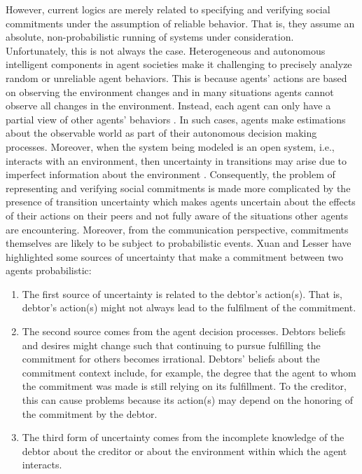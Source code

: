 However, current logics are merely related to specifying and
verifying social commitments under the assumption of reliable behavior. That is, they assume an absolute, non-probabilistic running of systems under consideration.
Unfortunately, this is not always the case. Heterogeneous and
autonomous intelligent components in agent societies make it
challenging to precisely analyze random or unreliable agent
behaviors. This is because agents' actions are based on observing the
environment changes and in many situations agents cannot observe
all changes in the environment. Instead, each agent can only have a
partial view of other agents' behaviors \cite{LeeL09}. In such
cases, agents make estimations about the observable world as part
of their autonomous decision making processes. Moreover, when the
system being modeled is an open system, i.e., interacts with an
environment, then uncertainty in transitions may arise due to
imperfect information about the environment \cite{Walley1996}. Consequently, the problem of representing and verifying social commitments is made more complicated by the presence of transition uncertainty which makes agents uncertain about the effects of their actions on their peers and not fully
aware of the situations other agents are encountering. Moreover,
from the communication perspective, commitments themselves are
likely to be subject to probabilistic events. Xuan and Lesser
\cite{Xuan1999} have highlighted some sources of uncertainty that
make a commitment between two agents probabilistic:

\begin{enumerate}
\item The first source of uncertainty is related to the debtor's action(s). That is, debtor's action(s) might not always lead to the fulfilment of the commitment.

\item The second source comes from the agent decision processes. Debtors beliefs and desires might change such that continuing to pursue fulfilling the commitment for others becomes irrational. Debtors' beliefs about the commitment context include, for example, the degree that the agent to whom the commitment was made is still relying on its fulfillment. To the creditor, this can cause problems because its action(s) may depend on the honoring of the commitment by the debtor.

\item The third form of uncertainty comes from the incomplete knowledge of the debtor about the creditor or about the environment within which the agent interacts.
\end{enumerate}



